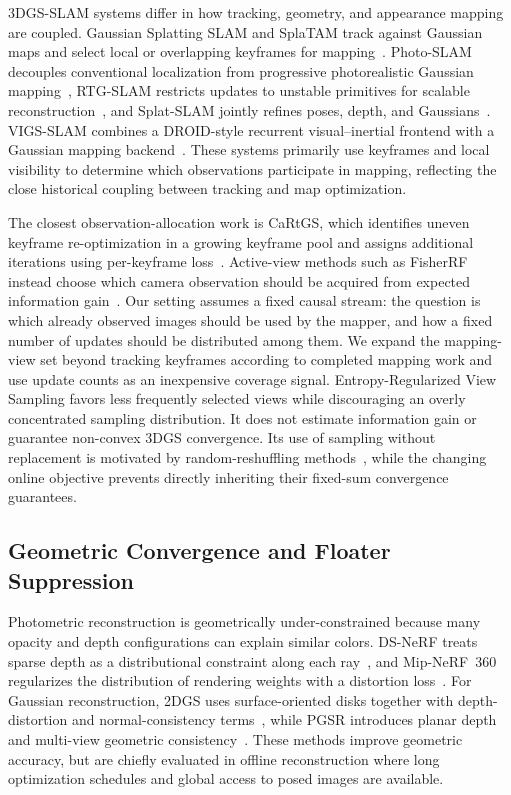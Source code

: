 3DGS-SLAM systems differ in how tracking, geometry, and appearance mapping are
coupled. Gaussian Splatting SLAM and SplaTAM track against Gaussian maps and
select local or overlapping keyframes for mapping~\cite{matsuki2024monogs,
splatam2024}. Photo-SLAM decouples conventional localization from progressive
photorealistic Gaussian mapping~\cite{huang2024photoslam}, RTG-SLAM restricts
updates to unstable primitives for scalable reconstruction~\cite{rtgslam2024},
and Splat-SLAM jointly refines poses, depth, and Gaussians~\cite{splatslam2024}.
VIGS-SLAM combines a DROID-style recurrent visual--inertial frontend with a
Gaussian mapping backend~\cite{vigsslam}. These systems primarily use
keyframes and local visibility to determine which observations participate in
mapping, reflecting the close historical coupling between tracking and map
optimization.

The closest observation-allocation work is CaRtGS, which identifies uneven
keyframe re-optimization in a growing keyframe pool and assigns additional
iterations using per-keyframe loss~\cite{cartgs}. Active-view methods such as
FisherRF instead choose which camera observation should be acquired from
expected information gain~\cite{jiang2024fisherrf}. Our setting assumes a
fixed causal stream: the question is which already observed images should be
used by the mapper, and how a fixed number of updates should be distributed
among them. We expand the mapping-view set beyond tracking keyframes according
to completed mapping work and use update counts as an inexpensive coverage
signal. Entropy-Regularized View Sampling favors less frequently selected
views while discouraging an overly concentrated sampling distribution. It
does not estimate information gain or guarantee non-convex 3DGS convergence.
Its use of sampling without replacement is motivated by
random-reshuffling methods~\cite{shamir2016without,mishchenko2020random}, while
the changing online objective prevents directly inheriting their fixed-sum
convergence guarantees.

\subsection{Geometric Convergence and Floater Suppression}
Photometric reconstruction is geometrically under-constrained because many
opacity and depth configurations can explain similar colors. DS-NeRF treats
sparse depth as a distributional constraint along each ray~\cite{deng2022dsnerf},
and Mip-NeRF~360 regularizes the distribution of rendering weights with a
distortion loss~\cite{mipnerf360}. For Gaussian reconstruction, 2DGS uses
surface-oriented disks together with depth-distortion and normal-consistency
terms~\cite{huang20242dgs}, while PGSR introduces planar depth and multi-view
geometric consistency~\cite{chen2024pgsr}. These methods improve geometric
accuracy, but are chiefly evaluated in offline reconstruction where long
optimization schedules and global access to posed images are available.

